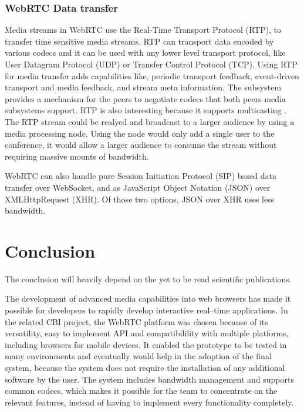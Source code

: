 \documentclass[english,12pt,a4paper,dvips]{article}
\begin{document}
\subsubsection{WebRTC Data transfer}

Media streams in WebRTC use the Real-Time Transport Protocol (RTP), to transfer time sensitive media streams. RTP can transport data encoded by various codecs and it can be used with any lower level transport protocol, like User Datagram Protocol (UDP) or Transfer Control Protocol (TCP). Using RTP for media transfer adds capabilities like, periodic transport feedback, event-driven transport and media feedback, and stream meta information. The subsystem provides a mechanism for the peers to negotiate codecs that both peers media subsystems support. \cite{Jennings} \cite{Johnston} \cite{Frederick} RTP is also interesting because it supports multicasting \cite{Frederick}. The RTP stream could be realyed and broadcast to a larger audience by using a media processing node. Using the node would only add a single user to the conference, it would allow a larger audience to consume the stream without requiring massive mounts of bandwidth.

WebRTC can also handle pure Session Initiation Protocol (SIP) based data transfer over WebSocket, and as JavaScript Object Notation (JSON) over XMLHttpRequest (XHR). Of those two options, JSON over XHR uses less bandwidth. \cite{Adeyeye}




\clearpage


\section{Conclusion}

The conclusion will heavily depend on the yet to be read scientific publications.

The development of advanced media capabilities into web browsers has made it possible for developers to rapidly develop interactive real--time applications. In the related CBI project, the WebRTC platform was chosen because of its versatility, easy to implement API and compatibilility with multiple platforms, including browsers for mobile devices. It enabled the prototype to be tested in many environments and eventually would help in the adoption of the final system, because the system does not require the installation of any additional software by the user.
The system includes bandwidth management and supports common codecs, which makes it possible for the team to concentrate on the relevant features, instead of having to implement every functionality completely.
\end{document}
